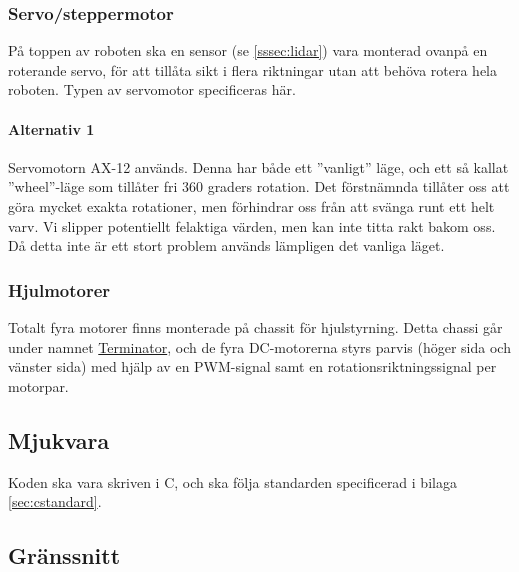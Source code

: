 \documentclass[a4paper,11pt]{article}
\begin{document}
\subsubsection{Servo/steppermotor} \label{ssec:servomotor}
På toppen av roboten ska en sensor (se \ref{sssec:lidar}) vara monterad ovanpå en roterande servo, för att tillåta sikt i flera riktningar utan att behöva rotera hela roboten. Typen av servomotor specificeras här.

\paragraph{Alternativ 1}
Servomotorn AX-12 används. Denna har både ett ''vanligt'' läge, och ett så kallat ''wheel''-läge som tillåter fri 360 graders rotation. Det förstnämnda tillåter oss att göra mycket exakta rotationer, men förhindrar oss från att svänga runt ett helt varv. Vi slipper potentiellt felaktiga värden, men kan inte titta rakt bakom oss. Då detta inte är ett stort problem används lämpligen det vanliga läget.

\subsubsection{Hjulmotorer}
Totalt fyra motorer finns monterade på chassit för hjulstyrning. Detta chassi går under namnet \href{https://docs.isy.liu.se/pub/VanHeden/DataSheets/terminator_prel.pdf}{Terminator}, och de fyra DC-motorerna styrs parvis (höger sida och vänster sida) med hjälp av en PWM-signal samt en rotationsriktningssignal per motorpar.

\subsection{Mjukvara}

Koden ska vara skriven i C, och ska följa standarden specificerad i bilaga \ref{sec:cstandard}.

\subsection{Gränssnitt} \label{ssec:controllInterface}
\end{document}
